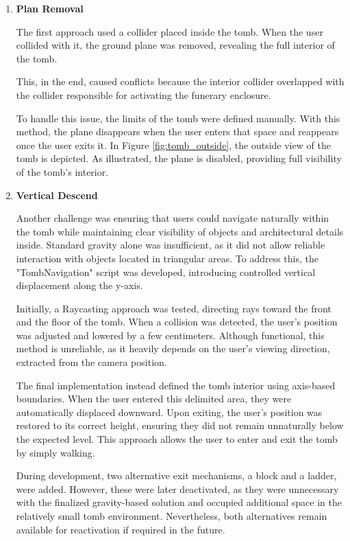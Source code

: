 \begin{enumerate}
\item{\textbf{Plan Removal}

The first approach used a collider placed inside the tomb. When the user collided with it, the ground plane was removed, revealing the full interior of the tomb.

This, in the end, caused conflicts because the interior collider overlapped with the collider responsible for activating the funerary enclosure.

To handle this issue, the limits of the tomb were defined manually. With this method, the plane disappears when the user enters that space and reappears once the user exits it.
In Figure \ref{fig:tomb_outside}, the outside view of the tomb is depicted. As illustrated, the plane is disabled, providing full visibility of the tomb’s interior.
}
\item{
\textbf{Vertical Descend}

Another challenge was ensuring that users could navigate naturally within the tomb while maintaining clear visibility of objects and architectural details inside. Standard gravity alone was insufficient, as it did not allow reliable interaction with objects located in triangular areas.
To address this, the "TombNavigation" script was developed, introducing controlled vertical displacement along the y-axis.

Initially, a Raycasting approach was tested, directing rays toward the front and the floor of the tomb. When a collision was detected, the user’s position was adjusted and lowered by a few centimeters. Although functional, this method is unreliable, as it heavily depends on the user’s viewing direction, extracted from the camera position.

The final implementation instead defined the tomb interior using axis-based boundaries. When the user entered this delimited area, they were automatically displaced downward. Upon exiting, the user’s position was restored to its correct height, ensuring they did not remain unnaturally below the expected level. This approach allows the user to enter and exit the tomb by simply walking.

During development, two alternative exit mechanisms, a block and a ladder, were added. However, these were later deactivated, as they were unnecessary with the finalized gravity-based solution and occupied additional space in the relatively small tomb environment. Nevertheless, both alternatives remain available for reactivation if required in the future.
}
\end{enumerate}


